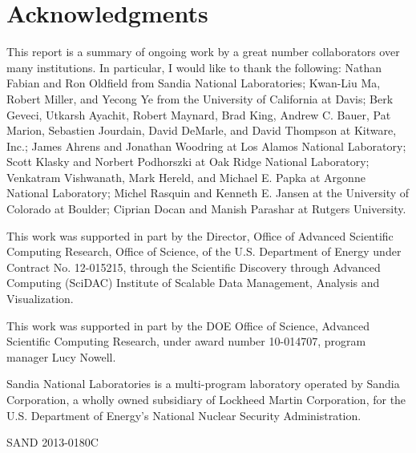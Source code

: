 \documentclass[conference]{IEEEtran}
\begin{document}
\section*{Acknowledgments}

\noindent
This report is a summary of ongoing work by a great number collaborators
over many institutions.  In particular, I would like to thank the
following: Nathan Fabian and Ron Oldfield from Sandia National
Laboratories; Kwan-Liu Ma, Robert Miller, and Yecong Ye from the University
of California at Davis; Berk Geveci, Utkarsh Ayachit, Robert Maynard, Brad
King, Andrew C. Bauer, Pat Marion, Sebastien Jourdain, David DeMarle, and
David Thompson at Kitware, Inc.; James Ahrens and Jonathan Woodring at Los
Alamos National Laboratory; Scott Klasky and Norbert Podhorszki at Oak
Ridge National Laboratory; Venkatram Vishwanath, Mark Hereld, and Michael
E. Papka at Argonne National Laboratory; Michel Rasquin and Kenneth
E. Jansen at the University of Colorado at Boulder; Ciprian Docan and
Manish Parashar at Rutgers University.


This work was supported in part by the Director, Office of Advanced
Scientific Computing Research, Office of Science, of the U.S. Department of
Energy under Contract No. 12-015215, through the Scientific Discovery
through Advanced Computing (SciDAC) Institute of Scalable Data Management,
Analysis and Visualization.

This work was supported in part by the DOE Office of Science, Advanced
Scientific Computing Research, under award number 10-014707, program
manager Lucy Nowell.

Sandia National Laboratories is a multi-program laboratory operated by
Sandia Corporation, a wholly owned subsidiary of Lockheed Martin
Corporation, for the U.S. Department of Energy's National Nuclear Security
Administration.

\noindent
{\small SAND 2013-0180C}



\end{document}
